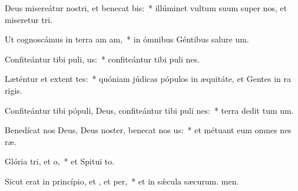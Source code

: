 \item Deus misereátur nostri, et benecat bis:~* illúminet vultum suum super nos, et miseretur tri.
\item Ut cognoscámus in terra am am,~* in ómnibus Géntibus salure um.
\item Confiteántur tibi puli, us:~* confiteántur tibi puli nes.
\item Læténtur et extent tes:~* quóniam júdicas pópulos in æquitáte, et Gentes in ra rigis.
\item Confiteántur tibi pópuli, Deus, confiteántur tibi puli nes:~* terra dedit tum um.
\item Benedícat nos Deus, Deus noster, benecat nos us:~* et métuant eum omnes nes ræ.
\item Glória tri, et o,~* et Spitui to.
\item Sicut erat in princípio, et , et per,~* et in sǽcula sæcurum. men.
